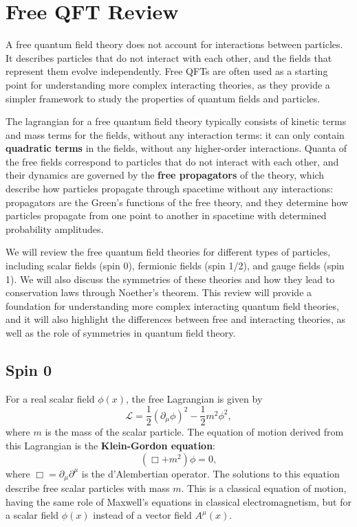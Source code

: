 \chapter{Free QFT Review}

A free quantum field theory does not account for interactions between particles. It describes particles that do not interact with each other, and the fields that represent them evolve independently. Free QFTs are often used as a starting point for understanding more complex interacting theories, as they provide a simpler framework to study the properties of quantum fields and particles.

The lagrangian for a free quantum field theory typically consists of kinetic terms and mass terms for the fields, without any interaction terms: it can only contain \textbf{quadratic terms} in the fields, without any higher-order interactions.
Quanta of the free fields correspond to particles that do not interact with each other, and their dynamics are governed by the \textbf{free propagators} of the theory, which describe how particles propagate through spacetime without any interactions: propagators are the Green's functions of the free theory, and they determine how particles propagate from one point to another in spacetime with determined probability amplitudes.

We will review the free quantum field theories for different types of particles, including scalar fields (spin 0), fermionic fields (spin 1/2), and gauge fields (spin 1). We will also discuss the symmetries of these theories and how they lead to conservation laws through Noether's theorem. This review will provide a foundation for understanding more complex interacting quantum field theories, and it will also highlight the differences between free and interacting theories, as well as the role of symmetries in quantum field theory.

\section{Spin 0}

For a real scalar field $\phi(x)$, the free Lagrangian is given by
\begin{equation}
    \mathcal{L} = \frac{1}{2} (\partial_\mu \phi)^2 - \frac{1}{2} m^2 \phi^2,
    \label{eq:free_KG_lagrangian}
\end{equation}
where $m$ is the mass of the scalar particle. The equation of motion derived from this Lagrangian is the \textbf{Klein-Gordon equation}:
\begin{equation}
    (\Box + m^2) \phi = 0,
    \label{eq:free_KG_equation}
\end{equation}
where $\Box = \partial_\mu \partial^\mu$ is the d'Alembertian operator. The solutions to this equation describe free scalar particles with mass $m$. This is a classical equation of motion, having the same role of Maxwell's equations in classical electromagnetism, but for a scalar field \(\phi(x)\) instead of a vector field \(A^{\mu}(x)\).


